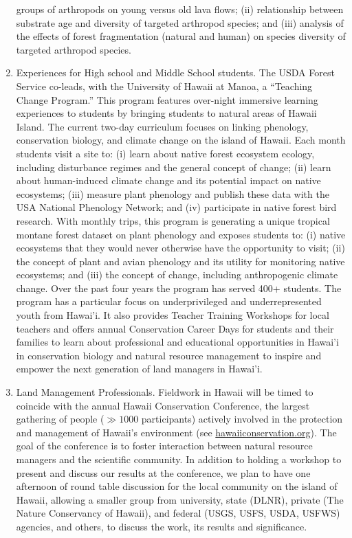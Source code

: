 \documentclass[11pt]{article}
\begin{document}
\begin{enumerate}
  groups of arthropods on young versus old lava flows; (ii)
  relationship between substrate age and diversity of targeted
  arthropod species; and (iii) analysis of the effects of forest
  fragmentation (natural and human) on species diversity of targeted
  arthropod species.
\item Experiences for High school and Middle School students. The USDA
  Forest Service co-leads, with the University of Hawaii at Manoa, a
  ``Teaching Change Program.'' This program features over-night
  immersive learning experiences to students by bringing students to
  natural areas of Hawaii Island. The current two-day curriculum
  focuses on linking phenology, conservation biology, and climate
  change on the island of Hawaii. Each month students visit a site to:
  (i) learn about native forest ecosystem ecology, including
  disturbance regimes and the general concept of change; (ii) learn
  about human-induced climate change and its potential impact on
  native ecosystems; (iii) measure plant phenology and publish these
  data with the USA National Phenology Network; and (iv) participate
  in native forest bird research. With monthly trips, this program is
  generating a unique tropical montane forest dataset on plant
  phenology and exposes students to: (i) native ecosystems that they
  would never otherwise have the opportunity to visit; (ii) the
  concept of plant and avian phenology and its utility for monitoring
  native ecosystems; and (iii) the concept of change, including
  anthropogenic climate change. Over the past four years the program
  has served 400+ students. The program has a particular focus on
  underprivileged and underrepresented youth from Hawai'i. It also
  provides Teacher Training Workshops for local teachers and offers
  annual Conservation Career Days for students and their families to
  learn about professional and educational opportunities in Hawai'i in
  conservation biology and natural resource management to inspire and
  empower the next generation of land managers in Hawai'i.
\item Land Management Professionals. Fieldwork in Hawaii will be timed
  to coincide with the annual Hawaii Conservation Conference, the
  largest gathering of people ($\gg 1000$ participants) actively involved
  in the protection and management of Hawaii's environment (see
  \url{hawaiiconservation.org}). The goal of the conference is to
  foster interaction between natural resource managers and the
  scientific community. In addition to holding a workshop to present
  and discuss our results at the conference, we plan to have one
  afternoon of round table discussion for the local community on the
  island of Hawaii, allowing a smaller group from university, state
  (DLNR), private (The Nature Conservancy of Hawaii), and federal
  (USGS, USFS, USDA, USFWS) agencies, and others, to discuss the work,
  its results and significance.
\end{enumerate}
\end{document}
